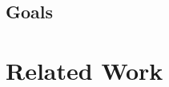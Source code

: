 \documentclass[a4paper, 12pt]{article}
\begin{document}





\subsection{Goals}



\section{Related Work}


\end{document}
